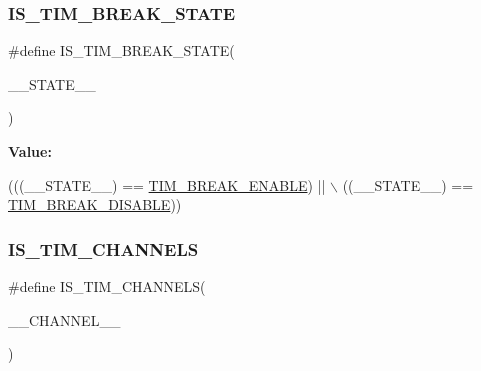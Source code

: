 \subsubsection{\texorpdfstring{I\+S\+\_\+\+T\+I\+M\+\_\+\+B\+R\+E\+A\+K\+\_\+\+S\+T\+A\+TE}{IS\_TIM\_BREAK\_STATE}}
{\footnotesize\ttfamily \#define I\+S\+\_\+\+T\+I\+M\+\_\+\+B\+R\+E\+A\+K\+\_\+\+S\+T\+A\+TE(\begin{DoxyParamCaption}\item[{}]{\+\_\+\+\_\+\+S\+T\+A\+T\+E\+\_\+\+\_\+ }\end{DoxyParamCaption})}

{\bfseries Value\+:}
\begin{DoxyCode}
(((\_\_STATE\_\_) == \hyperlink{group___t_i_m___break___input__enable__disable_ga3f966247b03532b8d93f9bddc032d863}{TIM\_BREAK\_ENABLE}) || \(\backslash\)
                                            ((\_\_STATE\_\_) == \hyperlink{group___t_i_m___break___input__enable__disable_ga8b34ce60f3f08c4b0d924a6546939994}{TIM\_BREAK\_DISABLE}))
\end{DoxyCode}
\mbox{\label{group___t_i_m___private___macros_ga3641d445a28293a77ddc2232e624a858}} 
\subsubsection{\texorpdfstring{I\+S\+\_\+\+T\+I\+M\+\_\+\+C\+H\+A\+N\+N\+E\+LS}{IS\_TIM\_CHANNELS}}
{\footnotesize\ttfamily \#define I\+S\+\_\+\+T\+I\+M\+\_\+\+C\+H\+A\+N\+N\+E\+LS(\begin{DoxyParamCaption}\item[{}]{\+\_\+\+\_\+\+C\+H\+A\+N\+N\+E\+L\+\_\+\+\_\+ }\end{DoxyParamCaption})}

